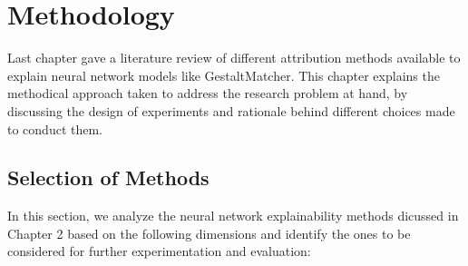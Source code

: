 \documentclass[../report.tex]{subfiles}
\begin{document}
    \chapter{Methodology}
	Last chapter gave a literature review of different attribution methods available to explain neural network models like GestaltMatcher. This chapter explains the methodical approach taken to address the research problem at hand, by discussing the design of experiments and rationale behind different choices made to conduct them. 

    
    \section{Selection of Methods}
    In this section, we analyze the neural network explainability methods dicussed in Chapter 2 based on the following dimensions and identify the ones to be considered for further experimentation and evaluation:
\end{document}
